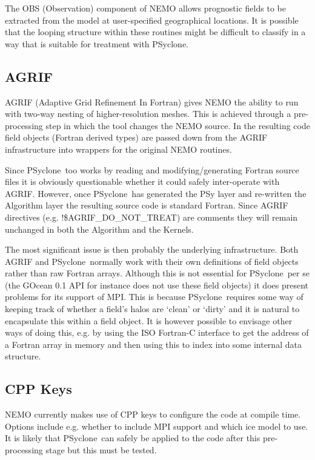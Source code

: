 \documentclass{article}
\newcommand{\psyclone}{{PS}yclone}
\begin{document}
The OBS (Observation) component of NEMO allows prognostic fields to be
extracted from the model at user-specified geographical locations.  It
is possible that the looping structure within these routines might be
difficult to classify in a way that is suitable for treatment with
\psyclone.

\subsection{AGRIF}

AGRIF (Adaptive Grid Refinement In Fortran) gives NEMO the ability to
run with two-way nesting of higher-resolution meshes. This is achieved
through a pre-processing step in which the tool changes the NEMO
source. In the resulting code field objects (Fortran derived types)
are passed down from the AGRIF infrastructure into wrappers for the
original NEMO routines.

Since \psyclone\ too works by reading and modifying/generating Fortran
source files it is obviously questionable whether it could safely
inter-operate with AGRIF. However, once \psyclone\ has generated the PSy
layer and re-written the Algorithm layer the resulting source code is
standard Fortran. Since AGRIF directives
(e.g. !\$AGRIF\_DO\_NOT\_TREAT) are comments they will remain unchanged
in both the Algorithm and the Kernels.

The most significant issue is then probably the underlying
infrastructure.  Both AGRIF and \psyclone\ normally work with their own
definitions of field objects rather than raw Fortran arrays. Although
this is not essential for \psyclone\ per se (the GOcean 0.1 API for
instance does not use these field objects) it does present problems
for its support of MPI. This is because \psyclone\ requires some way of
keeping track of whether a field's halos are `clean' or `dirty' and it
is natural to encapsulate this within a field object. It is however
possible to envisage other ways of doing this, e.g. by using the ISO
Fortran-C interface to get the address of a Fortran array in memory
and then using this to index into some internal data structure.

\subsection{CPP Keys}

NEMO currently makes use of CPP keys to configure the code at compile
time. Options include e.g. whether to include MPI support and which
ice model to use. It is likely that \psyclone\ can safely be applied to
the code after this pre-processing stage but this must be tested.
\end{document}
